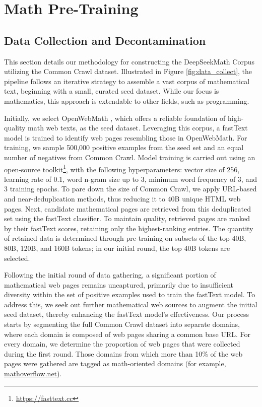 \section{Math Pre-Training}

\subsection{Data Collection and Decontamination}
This section details our methodology for constructing the DeepSeekMath Corpus utilizing the Common Crawl dataset. Illustrated in Figure \ref{fig:data_collect}, the pipeline follows an iterative strategy to assemble a vast corpus of mathematical text, beginning with a small, curated seed dataset. While our focus is mathematics, this approach is extendable to other fields, such as programming.

Initially, we select OpenWebMath \citep{openwebmath}, which offers a reliable foundation of high-quality math web texts, as the seed dataset. Leveraging this corpus, a fastText model \citep{joulin2016fasttext} is trained to identify web pages resembling those in OpenWebMath. For training, we sample 500,000 positive examples from the seed set and an equal number of negatives from Common Crawl. Model training is carried out using an open-source toolkit\footnote{\url{https://fasttext.cc}}, with the following hyperparameters: vector size of 256, learning rate of 0.1, word n-gram size up to 3, minimum word frequency of 3, and 3 training epochs. To pare down the size of Common Crawl, we apply URL-based and near-deduplication methods, thus reducing it to 40B unique HTML web pages. Next, candidate mathematical pages are retrieved from this deduplicated set using the fastText classifier. To maintain quality, retrieved pages are ranked by their fastText scores, retaining only the highest-ranking entries. The quantity of retained data is determined through pre-training on subsets of the top 40B, 80B, 120B, and 160B tokens; in our initial round, the top 40B tokens are selected.

Following the initial round of data gathering, a significant portion of mathematical web pages remains uncaptured, primarily due to insufficient diversity within the set of positive examples used to train the fastText model. To address this, we seek out further mathematical web sources to augment the initial seed dataset, thereby enhancing the fastText model's effectiveness. Our process starts by segmenting the full Common Crawl dataset into separate domains, where each domain is composed of web pages sharing a common base URL. For every domain, we determine the proportion of web pages that were collected during the first round. Those domains from which more than 10\% of the web pages were gathered are tagged as math-oriented domains (for example, \url{mathoverflow.net}).

